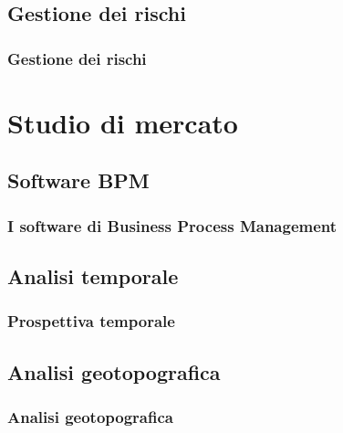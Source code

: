 \documentclass[compress,9pt]{beamer}
\begin{document}
\begin{frame}
\begin{columns}
{\begin{center}
\end{center}
}
\end{columns}

\end{frame}

\subsection{Gestione dei rischi}
\begin{frame}%
\frametitle{Gestione dei rischi}
\end{frame}

\section{Studio di mercato}
\subsection{Software BPM}
\begin{frame}%
\frametitle{I software di Business Process Management}
\end{frame}

\subsection{Analisi temporale}
\begin{frame}%
\frametitle{Prospettiva temporale}
\end{frame}

\subsection{Analisi geotopografica}
\begin{frame}%
\frametitle{Analisi geotopografica}
\end{frame}
\end{document}
